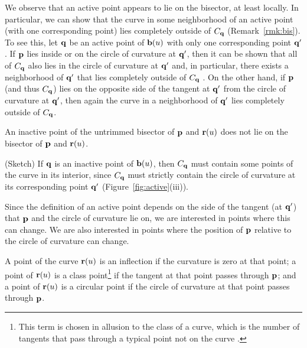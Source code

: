 
\begin{rmk}
\label{r:active}
{\rm
We observe that an active point appears to lie on the bisector, at least
locally. 
In particular, we can show that 
the curve in some neighborhood of an active point 
(with one corresponding
point) lies completely outside of $C_{\bf q}$ (Remark~\ref{rmk:bis}).
To see this, let ${\bf q}$ be an active point of ${\bf b}(u)$
with only one corresponding point ${\bf q}'$. If ${\bf p}$ lies inside or
on the circle of curvature at ${\bf q}'$, then 
it can be shown that 
all of $C_{\bf q}$ also lies in the circle of curvature at ${\bf q}'$ and,
in particular, there exists a neighborhood of ${\bf q}'$
that lies completely outside of $C_{\bf q}$ \cite[p.~176]{H52}.
On the other hand, if ${\bf p}$ (and thus $C_{\bf q}$) lies on the opposite side
of the tangent at ${\bf q}'$ from the circle of curvature at ${\bf q}'$,
then again the curve in a neighborhood of ${\bf q}'$ lies completely outside of
$C_{\bf q}$.
}
\end{rmk}

\begin{propn}
An inactive point of the untrimmed bisector of ${\bf p}$ and ${\bf r}(u)$
does not lie on the bisector of ${\bf p}$ and ${\bf r}(u)$.
\end{propn}
\prf
(Sketch) If ${\bf q}$ is an inactive point of ${\bf b}(u)$,
then $C_{\bf q}$ must contain some points of the curve in its interior,
since $C_{\bf q}$ must strictly contain the circle of curvature at its
corresponding point ${\bf q}'$ (Figure~\ref{fig:active}(iii)).
\QED

Since the definition of an active point depends on the side of the
tangent (at ${\bf q}'$) that ${\bf p}$ and the circle of curvature lie
on, we are interested in points where this can change.
We are also interested in points where the position of ${\bf p}$
relative to the circle of curvature can change.

\begin{dfn}
\label{d:trim}
A point of the curve ${\bf r}(u)$ is an {\rm inflection} if the curvature
is zero at that point;
a point of ${\bf r}(u)$ is a {\rm class point}\footnote
       {This term is chosen in allusion to the class of a curve,
        which is the number of tangents that pass through a typical point
        not on the curve \cite[p.~115]{W50}.}
if the tangent at that point passes through ${\bf p}$; and a point of
${\bf r}(u)$ is a {\rm circular point} if the circle of curvature at that
point passes through ${\bf p}$.
\end{dfn}

